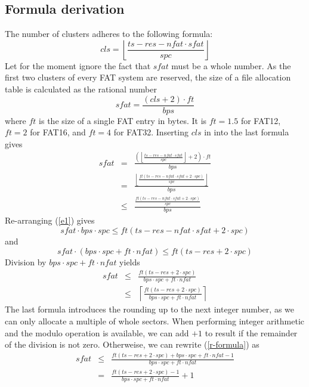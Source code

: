 \documentclass[12pt]{scrartcl}
\begin{document}
\subsection{Formula derivation}
The number of clusters adheres to the following formula:
\begin{equation}
cls = \left\lfloor\frac{ts - res - nfat \cdot sfat}{spc}\right\rfloor
\end{equation}
Let for the moment ignore the fact that $sfat$ must be a whole number. As the first two clusters of every FAT system are reserved, the size of a file allocation table is calculated as the rational number
\begin{equation}
sfat = \frac{(cls + 2) \cdot ft}{bps}
\end{equation}
where $ft$ is the size of a single FAT entry in bytes. It is $ft = 1.5$ for FAT12, $ft = 2$ for FAT16, and $ft = 4$ for FAT32. Inserting $cls$ in into the last formula gives
\begin{eqnarray}
sfat &=& \frac{\left(\left\lfloor\frac{ts - res - nfat \cdot sfat}{spc}\right\rfloor + 2\right) \cdot ft}{bps} \nonumber\\
 &=& \frac{\left\lfloor\frac{ft(ts - res - nfat \cdot sfat +2 \cdot spc)}{spc}\right\rfloor}{bps}\\
 \label{e1}
 &\le& \frac{\frac{ft(ts - res - nfat \cdot sfat +2 \cdot spc)}{spc}}{bps}
\end{eqnarray}
Re-arranging (\ref{e1}) gives
\begin{equation*}
sfat \cdot bps \cdot spc \le ft(ts - res - nfat \cdot sfat +2 \cdot spc)
\end{equation*}
and
\begin{equation*}
sfat \cdot (bps \cdot spc + ft \cdot nfat) \le ft(ts - res + 2 \cdot spc)
\end{equation*}
Division by $bps \cdot spc + ft \cdot nfat$ yields
\begin{eqnarray}
sfat &\le& \frac{ft(ts - res + 2 \cdot spc)}{bps \cdot spc + ft \cdot nfat}\nonumber\\
\label{r-formula}
 &\le& \left\lceil\frac{ft(ts - res + 2 \cdot spc)}{bps \cdot spc + ft \cdot nfat}\right\rceil
\end{eqnarray}
The last formula introduces the rounding up to the next integer number, as we can only allocate a multiple of whole sectors. When performing integer arithmetic and the modulo operation is available, we can add $+1$ to result if the remainder of the division is not zero. Otherweise, we can rewrite (\ref{r-formula}) as
\begin{eqnarray}
sfat &\le& \frac{ft(ts - res + 2 \cdot spc) + bps \cdot spc + ft \cdot nfat - 1}{bps \cdot spc + ft \cdot nfat} \nonumber\\
\label{gen-formula}
 &=& \frac{ft(ts - res + 2 \cdot spc) - 1}{bps \cdot spc + ft \cdot nfat} + 1
\end{eqnarray}
\end{document}
